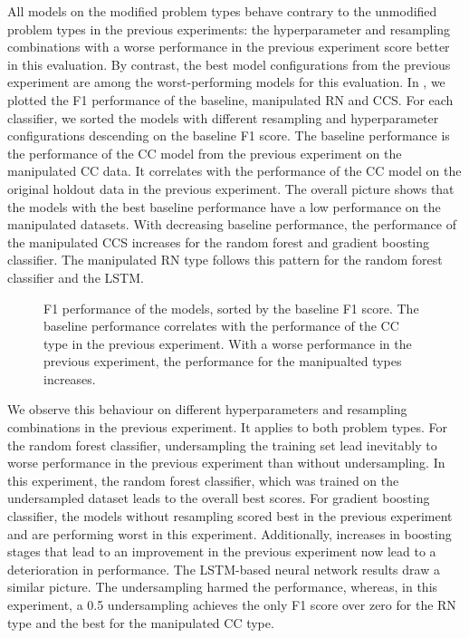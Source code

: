 All models on the modified problem types behave contrary to the unmodified problem types in the previous experiments: the hyperparameter and resampling combinations with a worse performance in the previous experiment score better in this evaluation. By contrast, the best model configurations from the previous experiment are among the worst-performing models for this evaluation. In , we plotted the F1 performance of the baseline, manipulated RN and CCS. For each classifier, we sorted the models with different resampling and hyperparameter configurations descending on the baseline F1 score. The baseline performance is the performance of the CC model from the previous experiment on the manipulated CC data. It correlates with the performance of the CC model on the original holdout data in the previous experiment. The overall picture shows that the models with the best baseline performance have a low performance on the manipulated datasets. With decreasing baseline performance, the performance of the manipulated CCS increases for the random forest and gradient boosting classifier. The manipulated RN type follows this pattern for the random forest classifier and the LSTM. 


\begin{figure}[h]
    \begin{center}
        
    \end{center}
    \caption[F1 performance of the models, sorted by the baseline F1 score.]{F1 performance of the models, sorted by the baseline F1 score. The baseline performance correlates with the performance of the CC type in the previous experiment. With a worse performance in the previous experiment, the performance for the manipualted types increases.}
    \label{fig:rq3_performance_comparison}
\end{figure}

We observe this behaviour on different hyperparameters and resampling combinations in the previous experiment. It applies to both problem types.
For the random forest classifier, undersampling the training set lead inevitably to worse performance in the previous experiment than without undersampling. In this experiment, the random forest classifier, which was trained on the undersampled dataset leads to the overall best scores. For gradient boosting classifier, the models without resampling scored best in the previous experiment and are performing worst in this experiment. Additionally, increases in boosting stages that lead to an improvement in the previous experiment now lead to a deterioration in performance. 
The LSTM-based neural network results draw a similar picture. The undersampling harmed the performance, whereas, in this experiment, a 0.5 undersampling achieves the only F1 score over zero for the RN type and the best for the manipulated CC type.

